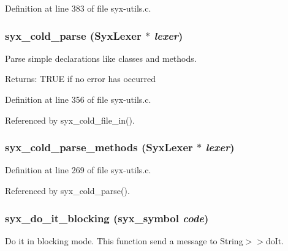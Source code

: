Definition at line 383 of file syx-utils.c.\hypertarget{syx-utils_8c_302b958f3a3125db9cfd393c0778d476}{
\subsubsection{ syx\_\-cold\_\-parse ({\bf SyxLexer} $\ast$ {\em lexer})}}
\label{syx-utils_8c_302b958f3a3125db9cfd393c0778d476}


Parse simple declarations like classes and methods.

\begin{Desc}
\item[Returns:]TRUE if no error has occurred \end{Desc}


Definition at line 356 of file syx-utils.c.

Referenced by syx\_\-cold\_\-file\_\-in().\hypertarget{syx-utils_8c_e258bc887d76d77c7ba41ec4a7bf962d}{
\subsubsection{ syx\_\-cold\_\-parse\_\-methods ({\bf SyxLexer} $\ast$ {\em lexer})}}
\label{syx-utils_8c_e258bc887d76d77c7ba41ec4a7bf962d}




Definition at line 269 of file syx-utils.c.

Referenced by syx\_\-cold\_\-parse().\hypertarget{syx-utils_8c_ea006a10f7a7358abc429ac047a35e5d}{
\subsubsection{ syx\_\-do\_\-it\_\-blocking ({\bf syx\_\-symbol} {\em code})}}
\label{syx-utils_8c_ea006a10f7a7358abc429ac047a35e5d}


Do it in blocking mode. This function send a message to String$>$$>$doIt.

